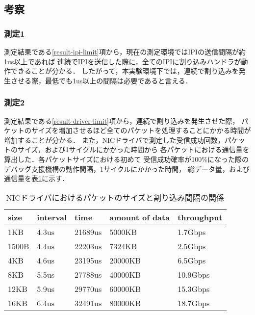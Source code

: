 \documentclass[submit,techreq,noauthor,dvipdfmx]{ipsj}
\begin{document}
\subsection{考察}

\subsubsection{測定1}

測定結果である\ref{result-ipi-limit}項から，現在の測定環境ではIPIの送信間隔が約1us以上であれば
連続でIPIを送信した際に，全てのIPIに割り込みハンドラが動作できることが分かる．
したがって，本実験環境下では，連続で割り込みを発生させる際，最低でも1us以上の間隔は必要であると言える．

\subsubsection{測定2}

測定結果である\ref{result-driver-limit}項から，連続で割り込みを発生させた際，
パケットのサイズを増加させるほど全てのパケットを処理することにかかる時間が増加することが分かる．
また，NICドライバで測定した受信成功回数，パケットのサイズ，および1サイクルにかかった時間から
各パケットにおける通信量を算出した．各パケットサイズにおける初めて
受信成功確率が100\%になった際のデバッグ支援機構の動作間隔，1サイクルにかかった時間，
総データ量，および通信量を表\ref{table:driver}に示す．
\begin{table}[h]
    \caption{NICドライバにおけるパケットのサイズと割り込み間隔の関係}
    \label{table:driver}
    \begin{center}
        \begin{tabular}{l|l|l|l|l}   \hline \hline 
            size   & interval      & time      & amount of data   & throughput       \\ \hline
            1KB      & 4.3us            & 21689us              & 5000KB       & 1.7Gbps            \\ 
            1500B    & 4.4us            & 22203us              & 7324KB       & 2.5Gbps            \\ 
            4KB      & 4.6us            & 23195us              & 20000KB      & 6.5Gbps            \\ 
            8KB      & 5.5us            & 27788us              & 40000KB      & 10.9Gbps           \\ 
            12KB     & 5.9us            & 29770us              & 60000KB      & 15.3Gbps           \\ 
            16KB     & 6.4us            & 32491us              & 80000KB      & 18.7Gbps           \\ \hline
        \end{tabular}
    \end{center}
\end{table}
\end{document}
